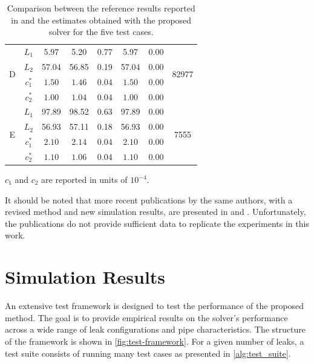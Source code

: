 \begin{table}[ht]
\begin{threeparttable}
\begin{tabular}{c|c|c|cc|ccc}
\multirow{4}{*}{D}
& $L_1$ & 5.97 & 5.20 & 0.77 & 5.97 & 0.00 
& \multirow{4}{*}{82977} \\
& $L_2$ & 57.04 & 56.85 & 0.19 & 57.04 & 0.00 & \\
& $c_1^*$ & $1.50$ & $1.46$ & $0.04$ & $1.50$ & 0.00 & \\
& $c_2^*$ & $1.00$ & $1.04$ & $0.04$ & $1.00$ & 0.00 & \\
\hline

\multirow{4}{*}{E}
& $L_1$ & 97.89 & 98.52 & 0.63 & 97.89 & 0.00 
& \multirow{4}{*}{7555} \\
& $L_2$ & 56.93 & 57.11 & 0.18 & 56.93 & 0.00 & \\
& $c_1^*$ & $2.10$ & $2.14$ & $0.04$ & $2.10$ & 0.00 & \\
& $c_2^*$ & $1.10$ & $1.06$ & $0.04$ & $1.10$ & 0.00 & \\
\hline

\end{tabular}

\begin{tablenotes}
\footnotesize
\item *$c_1$ and $c_2$ are reported in units of $10^{-4}$.
\end{tablenotes}

\end{threeparttable}
\caption{Comparison between the reference results reported in \cite{peralta2023} and the estimates obtained with the proposed solver for the five test cases.}
\label{tab:mork_vs_peralta}
\end{table}

It should be noted that more recent publications by the same authors, with a revised method and new simulation results, are presented in \cite{peralta2024} and \cite{peralta2025}. Unfortunately, the publications do not provide sufficient data to replicate the experiments in this work.

\newpage
\section{Simulation Results}

An extensive test framework is designed to test the performance of the proposed method. The goal is to provide empirical results on the solver's performance across a wide range of leak configurations and pipe characteristics. The structure of the framework is shown in \autoref{fig:test-framework}. For a given number of leaks, a test suite consists of running many test cases as presented in \autoref{alg:test_suite}.\\

